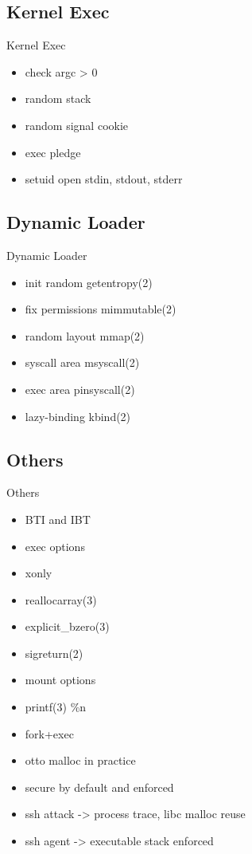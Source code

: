 \documentclass[14pt,aspectratio=169]{beamer}
\begin{document}
\subsection{Kernel Exec}
\begin{frame}{Kernel Exec}
\begin{itemize}
  \item check argc > 0
  \item random stack
  \item random signal cookie
  \item exec pledge
  \item setuid open stdin, stdout, stderr
\end{itemize}
\end{frame}

\subsection{Dynamic Loader}
\begin{frame}{Dynamic Loader}
\begin{itemize}
  \item init random getentropy(2)
  \item fix permissions mimmutable(2)
  \item random layout mmap(2)
  \item syscall area msyscall(2)
  \item exec area pinsyscall(2)
  \item lazy-binding kbind(2)
\end{itemize}
\end{frame}

\subsection{Others}
\begin{frame}{Others}
\begin{itemize}
  \item BTI and IBT
  \item exec options
  \item xonly
  \item reallocarray(3)
  \item explicit\_bzero(3)
  \item sigreturn(2)
  \item mount options
  \item printf(3) \%n
  \item fork+exec
  \item otto malloc in practice
  \item secure by default and enforced
  \item ssh attack -> process trace, libc malloc reuse
  \item ssh agent -> executable stack enforced
\end{itemize}
\end{frame}
\end{document}
